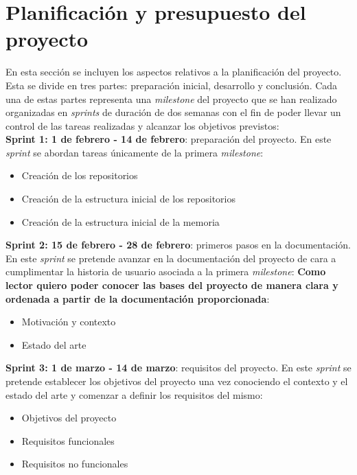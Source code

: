 \chapter{Planificación y presupuesto del proyecto}\label{ch:planificacion-y-presupuesto}

En esta sección se incluyen los aspectos relativos a la planificación del proyecto. Esta se divide en tres partes:
preparación inicial, desarrollo y conclusión. Cada una de estas partes representa una \textit{milestone} del proyecto
que se han realizado organizadas en \textit{sprints} de duración de dos semanas con el fin de poder llevar un control de las tareas realizadas
y alcanzar los objetivos previstos: \\

\textbf{Sprint 1: 1 de febrero - 14 de febrero}: preparación del proyecto. En este \textit{sprint} se abordan tareas únicamente
de la primera \textit{milestone}:

\begin{itemize}
    \item Creación de los repositorios
    \item Creación de la estructura inicial de los repositorios
    \item Creación de la estructura inicial de la memoria
\end{itemize}

\textbf{Sprint 2: 15 de febrero - 28 de febrero}: primeros pasos en la documentación. En este \textit{sprint} se pretende
avanzar en la documentación del proyecto de cara a cumplimentar la historia de usuario asociada a la primera \textit{milestone}:
\textbf{Como lector quiero poder conocer las bases del proyecto de manera clara y ordenada a partir de la documentación proporcionada}:
\begin{itemize}
    \item Motivación y contexto
    \item Estado del arte
\end{itemize}

\newpage

\textbf{Sprint 3: 1 de marzo - 14 de marzo}: requisitos del proyecto. En este \textit{sprint} se pretende establecer
los objetivos del proyecto una vez conociendo el contexto y el estado del arte y comenzar a definir los requisitos
del mismo:

\begin{itemize}
    \item Objetivos del proyecto
    \item Requisitos funcionales
    \item Requisitos no funcionales
\end{itemize}

